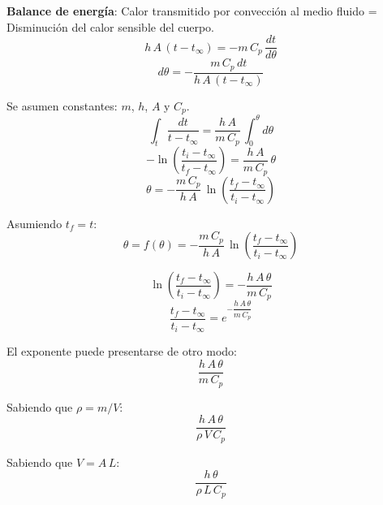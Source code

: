 \textbf{Balance de energía}: Calor transmitido por convección al medio fluido
= Disminución del calor sensible del cuerpo.
\begin{equation*}
    h\,A\,(t-t_{\infty}) = -m\,C_p\,\frac{dt}{d\theta}
\end{equation*}
\begin{equation*}
    d\theta = -\frac{m\,C_p\,dt}{h\,A\,(t-t_{\infty})}
\end{equation*}

Se asumen constantes: $m$, $h$, $A$ y $C_p$.
\begin{equation*}
    \int_t \frac{dt}{t-t_{\infty}} =
    \frac{h\,A}{m\,C_p}\,\int_0^{\theta} d\theta
\end{equation*}
\begin{equation*}
    -\ln\left(\frac{t_i-t_{\infty}}{t_f-t_{\infty}}\right) =
    \frac{h\,A}{m\,C_p}\,\theta
\end{equation*}
\begin{equation*}
    \theta =
    -\frac{m\,C_p}{h\,A}\,\ln\left(\frac{t_f-t_{\infty}}{t_i-t_{\infty}}\right)
    \label{uniforme_tiempo}
\end{equation*}

Asumiendo $t_f=t$:
\begin{equation}
    \theta = f(\theta) =
    -\frac{m\,C_p}{h\,A}\,\ln\left(\frac{t_f-t_{\infty}}{t_i-t_{\infty}}\right)
\end{equation}

\begin{equation*}
    \ln\left(\frac{t_f-t_{\infty}}{t_i-t_{\infty}}\right) =
    -\frac{h\,A\,\theta}{m\,C_p}
\end{equation*}
\begin{equation}
    \frac{t_f-t_{\infty}}{t_i-t_{\infty}} =
    e^{-\dfrac{h\,A\,\theta}{m\,C_p}}
    \label{uniforme_temperatura1}
\end{equation}

El exponente puede presentarse de otro modo:
\begin{equation*}
    \frac{h\,A\,\theta}{m\,C_p}
\end{equation*}

Sabiendo que $\rho=m/V$:
\begin{equation*}
    \frac{h\,A\,\theta}{\rho\,V\,C_p}
\end{equation*}

Sabiendo que $V=A\,L$:
\begin{equation*}
    \frac{h\,\theta}{\rho\,L\,C_p}
\end{equation*}

